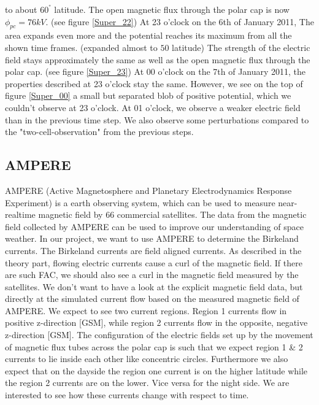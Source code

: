 \documentclass[10pt,a4paper]{article}
\begin{document}
to about $60^{°}$ latitude. The open magnetic flux through the polar cap is now $\phi_{pc}=76 k V$. (see figure \ref{Super_22})
At 23 o'clock on the 6th of January 2011, The area expands even more and the potential reaches its maximum from all the shown time frames. (expanded almost to $50$ \textdegree 
latitude) The strength of the electric field stays approximately the same as well as the open magnetic flux through the polar cap. (see figure \ref{Super_23})
At 00 o'clock on the 7th of January 2011, the properties described at 23 o'clock stay the same. However, we see on the top of figure \ref{Super_00} a small but 
separated blob of positive potential, which we couldn't observe at 23 o'clock.
At 01 o'clock, we observe a weaker electric field than in the previous time step. We also observe some perturbations compared to the  "two-cell-observation" from the 
previous steps. 


\subsection{AMPERE \label{0_CHAPTER_AMPERE}}
AMPERE (Active Magnetosphere and Planetary Electrodynamics Response Experiment) is a earth observing system, which can be used to measure near-realtime magnetic 
field by 66 commercial satellites. The data from the magnetic field collected by AMPERE can be used to improve our understanding of space weather. In our project, 
we want to use AMPERE to determine the Birkeland currents. The Birkeland currents are field aligned currents. As described in the theory part, flowing electric currents 
cause a curl of the magnetic field. If there are such FAC, we should also see a curl in the magnetic field measured by the satellites.
We don't want to have a look at the explicit magnetic field data, but directly at the simulated current flow based on the measured magnetic field of AMPERE. We expect to 
see two current regions. Region 1 currents flow in positive z-direction [GSM], while region 2 currents flow in the opposite, negative z-direction [GSM]. The configuration 
of the electric fields set up by the movement of magnetic flux tubes across the polar cap is such that we expect region 1 \& 2 currents to lie inside each other like 
concentric circles. Furthermore we also expect that on the dayside the region one current is on the higher latitude while the region 2 currents are on the lower. Vice 
versa for the night side. We are interested to see how these currents change with respect to time.  
\end{document}
